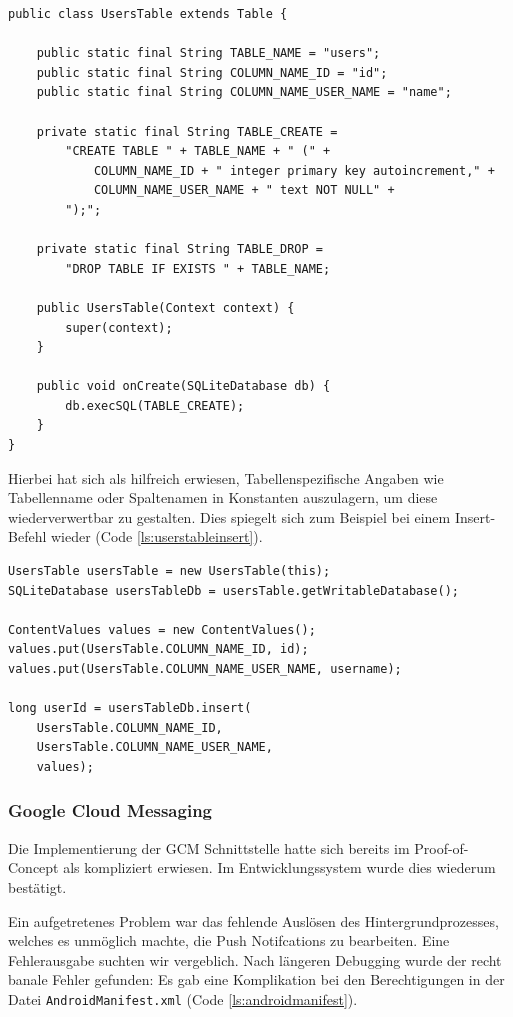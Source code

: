 \begin{lstlisting}[label=ls:userstableclass,caption=Ausschnitt aus der Klasse \texttt{UsersTable}]
public class UsersTable extends Table {

	public static final String TABLE_NAME = "users";
	public static final String COLUMN_NAME_ID = "id";
	public static final String COLUMN_NAME_USER_NAME = "name";

	private static final String TABLE_CREATE =
		"CREATE TABLE " + TABLE_NAME + " (" +
			COLUMN_NAME_ID + " integer primary key autoincrement," +
			COLUMN_NAME_USER_NAME + " text NOT NULL" +
		");";

	private static final String TABLE_DROP =
		"DROP TABLE IF EXISTS " + TABLE_NAME;

	public UsersTable(Context context) {
		super(context);
	}

	public void onCreate(SQLiteDatabase db) {
		db.execSQL(TABLE_CREATE);
	}
}
\end{lstlisting}

Hierbei hat sich als hilfreich erwiesen, Tabellenspezifische Angaben wie Tabellenname oder Spaltenamen in Konstanten auszulagern, um diese wiederverwertbar zu gestalten. Dies spiegelt sich zum Beispiel bei einem Insert-Befehl wieder (Code \ref{ls:userstableinsert}).

\begin{lstlisting}[label=ls:userstableinsert,caption=Exemplarisches Insert in die „UsersTable“]
UsersTable usersTable = new UsersTable(this);
SQLiteDatabase usersTableDb = usersTable.getWritableDatabase();

ContentValues values = new ContentValues();
values.put(UsersTable.COLUMN_NAME_ID, id);
values.put(UsersTable.COLUMN_NAME_USER_NAME, username);

long userId = usersTableDb.insert(
	UsersTable.COLUMN_NAME_ID,
	UsersTable.COLUMN_NAME_USER_NAME,
	values);
\end{lstlisting}

\subsubsection{Google Cloud Messaging}

Die Implementierung der GCM Schnittstelle hatte sich bereits im Proof-of-Concept als kompliziert erwiesen. Im Entwicklungssystem wurde dies wiederum bestätigt.

Ein aufgetretenes Problem war das fehlende Auslösen des Hintergrundprozesses, welches es unmöglich machte, die Push Notifcations zu bearbeiten. Eine Fehlerausgabe suchten wir vergeblich. Nach längeren Debugging wurde der recht banale Fehler gefunden: Es gab eine Komplikation bei den Berechtigungen in der Datei \texttt{AndroidManifest.xml} (Code \ref{ls:androidmanifest}).

